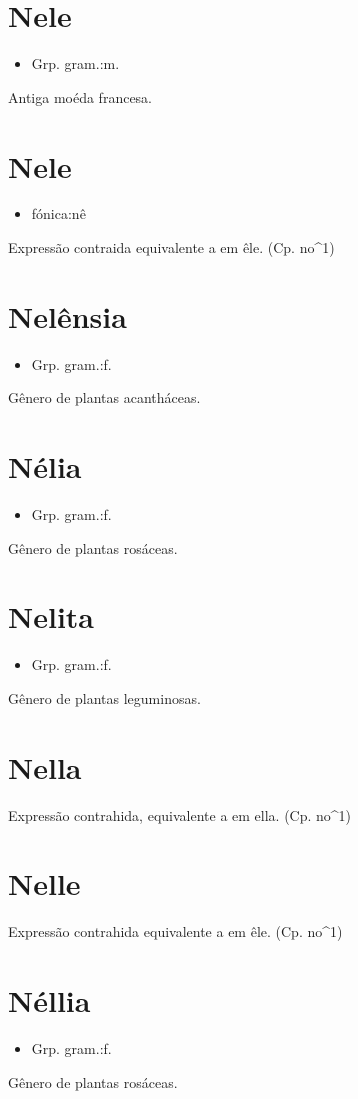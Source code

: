 \section{Nele}
\begin{itemize}
\item {Grp. gram.:m.}
\end{itemize}
Antiga moéda francesa.
\section{Nele}
\begin{itemize}
\item {fónica:nê}
\end{itemize}
Expressão contraida equivalente a \textunderscore em êle\textunderscore .
(Cp. \textunderscore no\textunderscore ^1)
\section{Nelênsia}
\begin{itemize}
\item {Grp. gram.:f.}
\end{itemize}
Gênero de plantas acantháceas.
\section{Nélia}
\begin{itemize}
\item {Grp. gram.:f.}
\end{itemize}
Gênero de plantas rosáceas.
\section{Nelita}
\begin{itemize}
\item {Grp. gram.:f.}
\end{itemize}
Gênero de plantas leguminosas.
\section{Nella}
Expressão contrahida, equivalente a \textunderscore em ella\textunderscore .
(Cp. \textunderscore no\textunderscore ^1)
\section{Nelle}
Expressão contrahida equivalente a \textunderscore em êle\textunderscore .
(Cp. \textunderscore no\textunderscore ^1)
\section{Néllia}
\begin{itemize}
\item {Grp. gram.:f.}
\end{itemize}
Gênero de plantas rosáceas.
